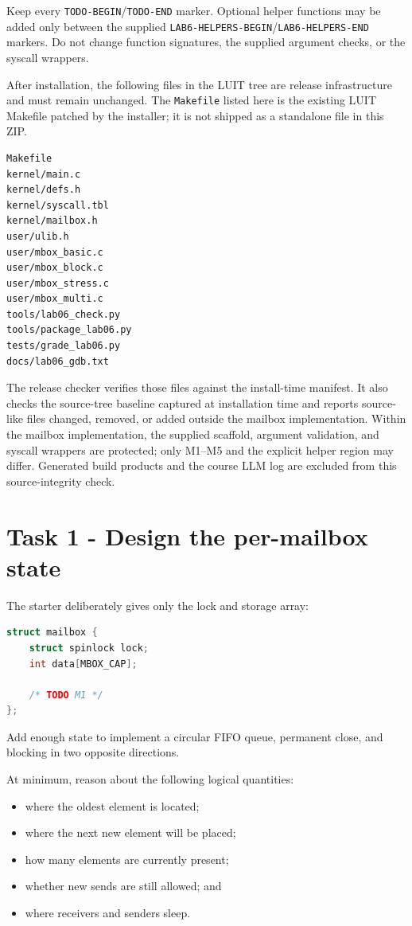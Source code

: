 \documentclass[11pt,a4paper]{article}
\newcommand{\file}[1]{\texttt{#1}}
\begin{document}
Keep every \file{TODO-BEGIN}/\file{TODO-END} marker. Optional helper functions may be added only between the supplied \file{LAB6-HELPERS-BEGIN}/\file{LAB6-HELPERS-END} markers. Do not change function signatures, the supplied argument checks, or the syscall wrappers.

After installation, the following files in the LUIT tree are release infrastructure and must remain unchanged. The \file{Makefile} listed here is the existing LUIT Makefile patched by the installer; it is not shipped as a standalone file in this ZIP.

\begin{lstlisting}
Makefile
kernel/main.c
kernel/defs.h
kernel/syscall.tbl
kernel/mailbox.h
user/ulib.h
user/mbox_basic.c
user/mbox_block.c
user/mbox_stress.c
user/mbox_multi.c
tools/lab06_check.py
tools/package_lab06.py
tests/grade_lab06.py
docs/lab06_gdb.txt
\end{lstlisting}

The release checker verifies those files against the install-time manifest. It also checks the source-tree baseline captured at installation time and reports source-like files changed, removed, or added outside the mailbox implementation. Within the mailbox implementation, the supplied scaffold, argument validation, and syscall wrappers are protected; only M1--M5 and the explicit helper region may differ. Generated build products and the course LLM log are excluded from this source-integrity check.

\section{Task 1 - Design the per-mailbox state}

The starter deliberately gives only the lock and storage array:

\begin{lstlisting}[language=C]
struct mailbox {
    struct spinlock lock;
    int data[MBOX_CAP];

    /* TODO M1 */
};
\end{lstlisting}

Add enough state to implement a circular FIFO queue, permanent close, and blocking in two opposite directions.

At minimum, reason about the following logical quantities:

\begin{itemize}[leftmargin=7mm]
\item where the oldest element is located;
\item where the next new element will be placed;
\item how many elements are currently present;
\item whether new sends are still allowed; and
\item where receivers and senders sleep.
\end{itemize}
\end{document}
